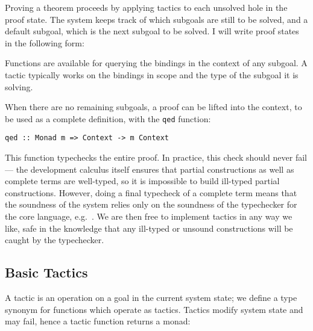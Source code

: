 Proving a theorem proceeds by applying tactics to each unsolved hole
in the proof state. The system keeps track of which subgoals are still
to be solved, and a default subgoal, which is the next subgoal to be
solved. I will write proof states in the following form:


Functions are available for querying the bindings in the context of
any subgoal. A tactic typically works on the bindings in scope and the
type of the subgoal it is solving.

When there are no remaining subgoals, a proof can be lifted into the
context, to be used as a complete definition, with the \texttt{qed}
function:

\begin{verbatim}
qed :: Monad m => Context -> m Context
\end{verbatim}

This function typechecks the entire proof. In practice, this check
should never fail --- the development calculus itself ensures that
partial constructions as well as complete terms are well-typed, so it
is impossible to build ill-typed partial constructions. However, doing
a final typecheck of a complete term means that the soundness of the
system relies only on the soundness of the typechecker for the core
language, e.g.~\cite{coq-in-coq}.  We are then free to implement tactics
in any way we like, safe in the knowledge that any ill-typed or
unsound constructions will be caught by the typechecker.


\subsection{Basic Tactics}

A tactic is an operation on a goal in the current system state; we
define a type synonym  for functions which operate as
tactics. Tactics modify system state and may fail, hence a tactic
function returns a monad:

